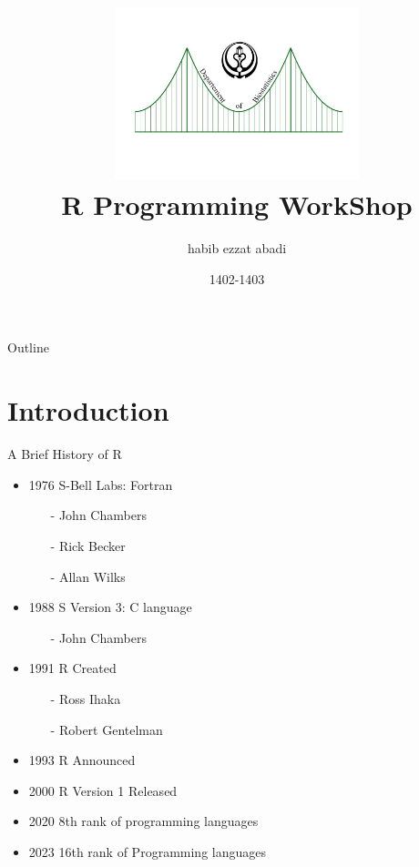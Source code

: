 \documentclass{beamer}\usepackage[]{graphicx}\usepackage[]{xcolor}
\date{\small 1402-1403\\[0.5cm]}
\title[R WorkShop]{\includegraphics[height = 5cm, width = 8cm]{Logo_Sums_BioStatistics.pdf}\\  R Programming WorkShop}
\author{habib ezzat abadi}
\institute{Shiraz University of Medical Scinece}
\begin{document}
\frame[plain]{\maketitle}

\begin{frame}{Outline}
    \tableofcontents
\end{frame}

\section{Introduction}
\begin{frame}{A Brief History of R}
 \begin{itemize}
\item 1976 S-Bell Labs: Fortran 
\begin{itemize}
\item[-]John Chambers
\item[-] Rick Becker
\item[-] Allan Wilks 
\end{itemize}
\item 1988 S Version 3: C language 
\begin{itemize}
    \item[-] John Chambers 
\end{itemize}
\item 1991 R Created 
\begin{itemize}
    \item[-] Ross Ihaka
    \item[-] Robert Gentelman 
\end{itemize}
\item 1993 R Announced
\item 2000 R Version 1 Released
\item 2020 8th rank of programming languages
\item 2023 16th rank of Programming languages
 \end{itemize}   
\end{frame}
\end{document}
